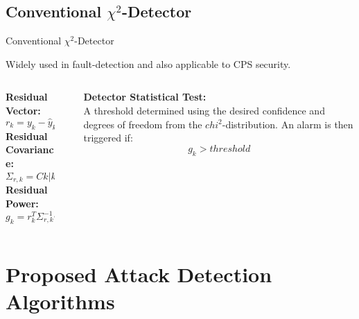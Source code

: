 \documentclass[aspectratio=169]{beamer}
\begin{document}
\subsection{Conventional $\chi^2$-Detector}
\begin{frame}{Conventional $\chi^2$-Detector}
	\begin{flushleft}
		Widely used in fault-detection and also applicable to CPS security.
	\end{flushleft}
	\begin{columns}
		\begin{column}{0.5\textwidth}
			\textbf{Residual Vector:}
			\begin{equation}
				r_k = y_k - \hat{y}_k = y_k - C \hat{x}_k
			\end{equation}
			\textbf{Residual Covariance:}
			\begin{equation}
				\Sigma_{r,k} = C {k \vert k} C^{T} + R
			\end{equation}
			\textbf{Residual Power:}
			\begin{equation}
				g_k = r_k^T \Sigma_{r,k}^{-1} r_k
			\end{equation}
		\end{column}
		\begin{column}{0.05\textwidth}\end{column}
		\begin{column}{0.45\textwidth}
			\textbf{Detector Statistical Test:}\\
			A threshold determined using the desired confidence and degrees of freedom from the $chi^2$-distribution. An alarm is then triggered if:
			\begin{equation}
				g_k > threshold
			\end{equation}
			\vspace{2em}
		\end{column}
	\end{columns}
\end{frame}


\section{Proposed Attack Detection Algorithms}
\end{document}
